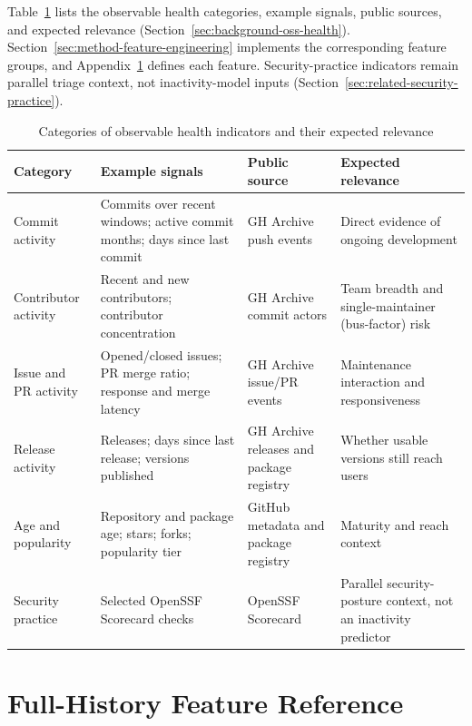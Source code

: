 Table~\ref{tab:background-health-indicators} lists the observable health
categories, example signals, public sources, and expected relevance
(Section~\ref{sec:background-oss-health}). Section~\ref{sec:method-feature-engineering}
implements the corresponding feature groups, and
Appendix~\ref{appendix:feature-reference} defines each feature.
Security-practice indicators remain parallel triage context, not inactivity-model
inputs (Section~\ref{sec:related-security-practice}).

\begin{table}[htbp]
\centering
\caption{Categories of observable health indicators and their expected relevance}
\label{tab:background-health-indicators}
\small
\begin{tabular}{p{} p{} p{} p{}}
\hline
\textbf{Category} & \textbf{Example signals} & \textbf{Public source} & \textbf{Expected relevance} \\
\hline
Commit activity & Commits over recent windows; active commit months; days since last commit & GH Archive push events & Direct evidence of ongoing development \\
Contributor activity & Recent and new contributors; contributor concentration & GH Archive commit actors & Team breadth and single-maintainer (bus-factor) risk \\
Issue and PR activity & Opened/closed issues; PR merge ratio; response and merge latency & GH Archive issue/PR events & Maintenance interaction and responsiveness \\
Release activity & Releases; days since last release; versions published & GH Archive releases and package registry & Whether usable versions still reach users \\
Age and popularity & Repository and package age; stars; forks; popularity tier & GitHub metadata and package registry & Maturity and reach context \\
Security practice & Selected OpenSSF Scorecard checks & OpenSSF Scorecard & Parallel security-posture context, not an inactivity predictor \\
\hline
\end{tabular}
\end{table}

\section{Full-History Feature Reference}
\label{appendix:feature-reference}

